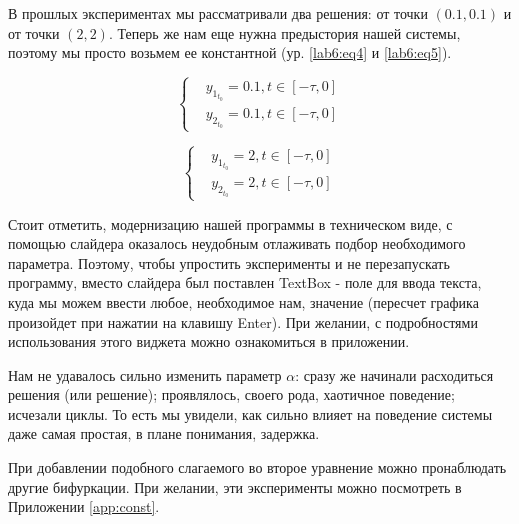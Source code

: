 В прошлых экспериментах мы рассматривали два решения: от точки
$(0.1, 0.1)$ и от точки $(2, 2)$. Теперь же нам еще нужна
предыстория нашей системы, поэтому мы просто возьмем ее константной
(ур. \eqref{lab6:eq4} и \eqref{lab6:eq5}).

\begin{equation}\label{lab6:eq4}
  \begin{cases}
    &y_{1_{t_0}} = 0.1, t \in [-\tau, 0]\\
    &y_{2_{t_0}} = 0.1, t \in [-\tau, 0]
  \end{cases}
\end{equation}

\begin{equation}\label{lab6:eq5}
  \begin{cases}
    &y_{1_{t_0}} = 2, t \in [-\tau, 0]\\
    &y_{2_{t_0}} = 2, t \in [-\tau, 0]
  \end{cases}
\end{equation}

Стоит отметить, модернизацию нашей программы в техническом
виде, с помощью слайдера оказалось неудобным отлаживать
подбор необходимого параметра. Поэтому, чтобы упростить
эксперименты и не перезапускать программу, вместо слайдера
был поставлен \textmd{TextBox} - поле для ввода текста, куда мы
можем ввести любое, необходимое нам, значение (пересчет
графика произойдет при нажатии на клавишу \textmd{Enter}).
При желании, с подробностями использования этого виджета
можно ознакомиться в приложении.

\clearpage
{}

Нам не удавалось сильно изменить параметр $\alpha$:
сразу же начинали расходиться решения (или решение);
проявлялось, своего рода, хаотичное поведение; исчезали циклы.
То есть мы увидели, как сильно влияет на поведение системы
даже самая простая, в плане понимания, задержка.

При добавлении подобного слагаемого во второе уравнение можно
пронаблюдать другие бифуркации. При желании, эти эксперименты
можно посмотреть в Приложении \ref{app:const}.
